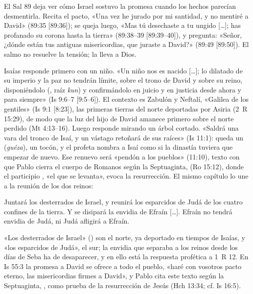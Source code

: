 El Sal 89 deja ver cómo Israel sostuvo la promesa cuando los hechos parecían desmentirla. Recita el pacto, «Una vez he jurado por mi santidad, y no mentiré a David» (89:35 [89:36]); se queja luego, «Mas tú desechaste a tu ungido [\ldots]; has profanado su corona hasta la tierra» (89:38--39 [89:39--40]), y pregunta: «Señor, ¿dónde están tus antiguas misericordias, que juraste a David?» (89:49 [89:50]). El salmo no resuelve la tensión; la lleva a Dios.

Isaías responde primero con un niño. «Un niño nos es nacido [\ldots]; lo dilatado de su imperio y la paz no tendrán límite, sobre el trono de David y sobre su reino, disponiéndolo (, raíz \emph{kun}) y confirmándolo en juicio y en justicia desde ahora y para siempre» (Is 9:6--7 [9:5--6]). El contexto es Zabulón y Neftalí, «Galilea de los gentiles» (Is 9:1 [8:23]), las primeras tierras del norte deportadas por Asiria (2~R 15:29), de modo que la luz del hijo de David amanece primero sobre el norte perdido (Mt 4:13--16). Luego responde mirando un árbol cortado. «Saldrá una vara del tronco de Isaí, y un vástago retoñará de sus raíces» (Is 11:1): queda un  (\emph{guéza}), un tocón, y el profeta nombra a Isaí como si la dinastía tuviera que empezar de nuevo. Ese renuevo será «pendón a los pueblos» (11:10), texto con que Pablo cierra el cuerpo de Romanos según la Septuaginta,  (Ro 15:12), donde el participio , «el que se levanta», evoca la resurrección. El mismo capítulo lo une a la reunión de los dos reinos:

\begin{cita}Juntará los desterrados de Israel, y reunirá los esparcidos de Judá de los cuatro confines de la tierra. Y se disipará la envidia de Efraín [\ldots]. Efraín no tendrá envidia de Judá, ni Judá afligirá a Efraín.\end{cita}

«Los desterrados de Israel» () son el norte, ya deportado en tiempos de Isaías, y «los esparcidos de Judá», el sur; la envidia que separaba a los reinos desde los días de Seba ha de desaparecer, y en ello está la respuesta profética a 1~R 12. En Is 55:3 la promesa a David se ofrece a todo el pueblo, «haré con vosotros pacto eterno, las misericordias firmes a David», y Pablo cita este texto según la Septuaginta, , como prueba de la resurrección de Jesús (Hch 13:34; cf. Is 16:5).

